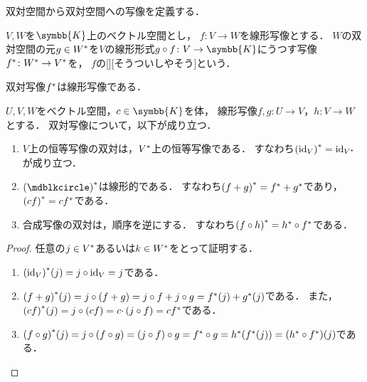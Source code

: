\documentclass[../sotsu.tex]{subfiles}
\begin{document}
双対空間から双対空間への写像を定義する．

\begin{definition}
    \label{dfn:dual-map}
    $V, W$を$\symbb{K}$上のベクトル空間とし，
    $f \colon V \to W$を線形写像とする．
    $W$の双対空間の元$g \in {W}^*$を$V$の線形形式$g \circ f \colon V \to \symbb{K}$にうつす写像
    ${f}^* \colon {W}^* \to {V}^*$を，
    $f$の[][そうついしやそう]という\cite[\S 4.3]{saito-lin-2007}．
\end{definition}

双対写像${f}^*$は線形写像である\cite[\S 4.3]{saito-lin-2007}．

\begin{proposition}
    \label{thm:dual-map-property}
    $U, V, W$をベクトル空間，$c \in \symbb{K}$を体，
    線形写像$f, g \colon U \to V$，$h \colon V \to W$とする．
    双対写像について，以下が成り立つ\cite[\S 4.3]{saito-lin-2007}．
    \begin{enumerate}
        \item $V$上の恒等写像の双対は，${V}^*$上の恒等写像である．
            すなわち${(\mathrm{id}_V)}^* = \mathrm{id}_{{V}^*}$が成り立つ．
        \item $\dual{(\bigdot)}$は線形的である．
            すなわち${(f + g)}^* = {f}^* + {g}^*$であり，${(cf)}^* = c{f}^*$である．
        \item 合成写像の双対は，順序を逆にする．
            すなわち${(f \circ h)}^* = {h}^* \circ {f}^*$である．
    \end{enumerate}
\end{proposition}

\begin{proof}
    任意の$j \in {V}^*$あるいは$k \in {W}^*$をとって証明する．
    \begin{enumerate}
        \item ${(\mathrm{id}_V)}^*(j) = j \circ \mathrm{id}_V = j$である．
        \item ${(f + g)}^*(j) = j \circ (f + g) = j \circ f + j \circ g = {f}^*(j) + {g}^*(j)$である．
            また，${(cf)}^*(j) = j \circ (cf) = c \cdotp (j \circ f) = c{f}^*$である．
        \item \(
            {(f \circ g)}^*(j) = j \circ (f \circ g) = (j \circ f) \circ g = {f}^* \circ g 
                = {h}^*( {f}^*(j) ) = ({h}^* \circ {f}^*)(j)
            \)である．
    \end{enumerate}
\end{proof}
\end{document}
